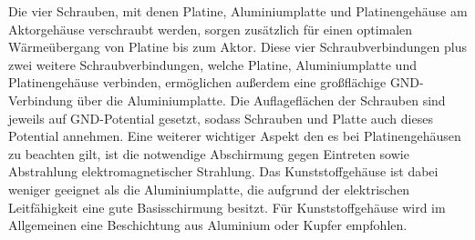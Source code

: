 Die vier Schrauben, mit denen Platine, Aluminiumplatte und Platinengehäuse am Aktorgehäuse verschraubt werden, sorgen zusätzlich für einen optimalen Wärmeübergang von Platine bis zum Aktor. Diese vier Schraubverbindungen plus zwei weitere Schraubverbindungen, welche Platine, Aluminiumplatte und Platinengehäuse verbinden, ermöglichen außerdem eine großflächige GND-Verbindung über die Aluminiumplatte. Die Auflageflächen der Schrauben sind jeweils auf GND-Potential gesetzt, sodass Schrauben und Platte auch dieses Potential annehmen.
Eine weiterer wichtiger Aspekt den es bei Platinengehäusen zu beachten gilt, ist die notwendige Abschirmung gegen Eintreten sowie Abstrahlung elektromagnetischer Strahlung. Das Kunststoffgehäuse ist dabei weniger geeignet als die Aluminiumplatte, die aufgrund der elektrischen Leitfähigkeit eine gute Basisschirmung besitzt. Für Kunststoffgehäuse wird im Allgemeinen eine Beschichtung aus Aluminium oder Kupfer empfohlen. \cite{Gwinner2006}

